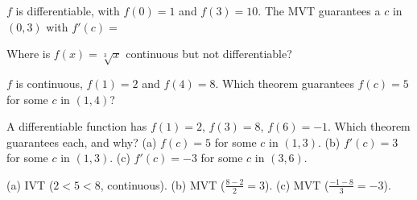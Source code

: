 \begin{exo}{}
$f$ is differentiable, with $f(0)=1$ and $f(3)=10$. The MVT guarantees a $c$ in $(0,3)$ with $f'(c)=$
\end{exo}
\begin{exo}{}
Where is $f(x)=\sqrt[3]{x}$ continuous but not differentiable?
\end{exo}
\begin{exo}{}
$f$ is continuous, $f(1)=2$ and $f(4)=8$. Which theorem guarantees $f(c)=5$ for some $c$ in $(1,4)$?
\end{exo}
\begin{exo}{}
A differentiable function has $f(1)=2$, $f(3)=8$, $f(6)=-1$. Which theorem guarantees each, and why? (a) $f(c)=5$ for some $c$ in $(1,3)$. (b) $f'(c)=3$ for some $c$ in $(1,3)$. (c) $f'(c)=-3$ for some $c$ in $(3,6)$.
\work{3.5cm}
\begin{solution}
(a) IVT ($2<5<8$, continuous). (b) MVT ($\frac{8-2}{2}=3$). (c) MVT ($\frac{-1-8}{3}=-3$).
\end{solution}
\end{exo}

